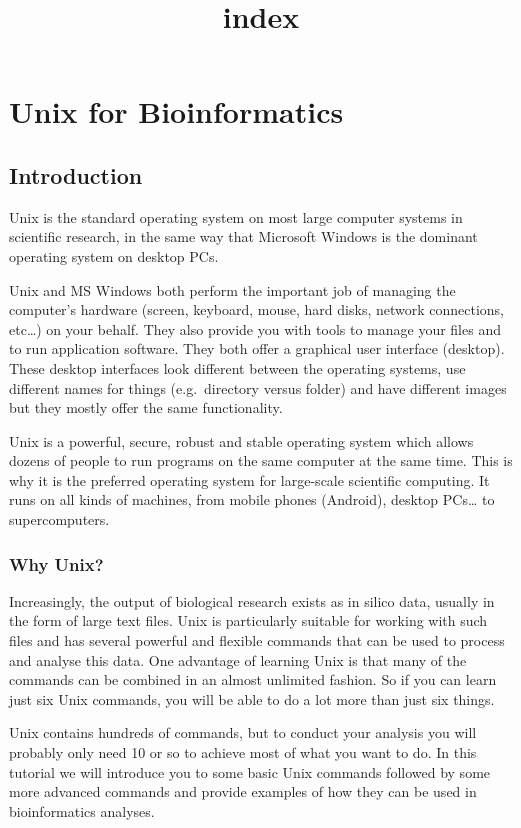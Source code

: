\documentclass[11pt]{article}
\title{index}
\begin{document}
    \hypertarget{unix-for-bioinformatics}{%
\section{Unix for Bioinformatics}\label{unix-for-bioinformatics}}

\hypertarget{introduction}{%
\subsection{Introduction}\label{introduction}}

Unix is the standard operating system on most large computer systems in
scientific research, in the same way that Microsoft Windows is the
dominant operating system on desktop PCs.

Unix and MS Windows both perform the important job of managing the
computer's hardware (screen, keyboard, mouse, hard disks, network
connections, etc\ldots) on your behalf. They also provide you with tools
to manage your files and to run application software. They both offer a
graphical user interface (desktop). These desktop interfaces look
different between the operating systems, use different names for things
(e.g.~directory versus folder) and have different images but they mostly
offer the same functionality.

Unix is a powerful, secure, robust and stable operating system which
allows dozens of people to run programs on the same computer at the same
time. This is why it is the preferred operating system for large-scale
scientific computing. It runs on all kinds of machines, from mobile
phones (Android), desktop PCs\ldots{} to supercomputers.

\hypertarget{why-unix}{%
\subsubsection{Why Unix?}\label{why-unix}}

Increasingly, the output of biological research exists as in silico
data, usually in the form of large text files. Unix is particularly
suitable for working with such files and has several powerful and
flexible commands that can be used to process and analyse this data. One
advantage of learning Unix is that many of the commands can be combined
in an almost unlimited fashion. So if you can learn just six Unix
commands, you will be able to do a lot more than just six things.

Unix contains hundreds of commands, but to conduct your analysis you
will probably only need 10 or so to achieve most of what you want to do.
In this tutorial we will introduce you to some basic Unix commands
followed by some more advanced commands and provide examples of how they
can be used in bioinformatics analyses.
\end{document}
